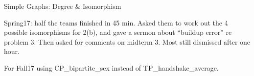 \documentclass[handout]{mcs}
\begin{document}


\begin{staffnotes}
Simple Graphs: Degree \& Isomorphism

Spring17: half the teams finished in 45 min.  Asked them to work out
the 4 possible isomorphisms for 2(b), and gave a sermon about
``buildup error'' re problem 3.  Then asked for comments on midterm 3.
Most still dismissed after one hour.

For Fall17 using CP\_bipartite\_sex instead of TP\_handshake\_average.
\end{staffnotes}






\end{document}
